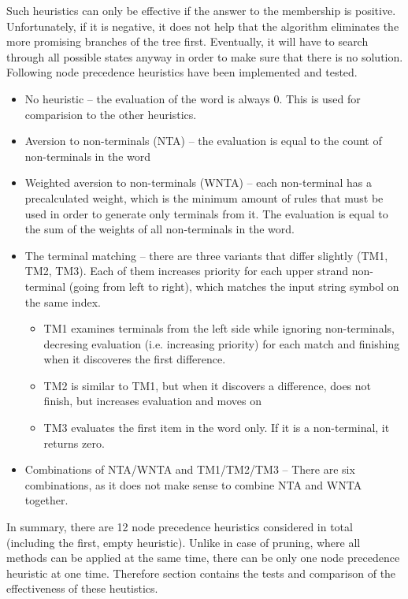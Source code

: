 \begin{enumerate}
Such heuristics can only be effective if the answer to the membership is positive. Unfortunately, if it is negative, it does not help that the algorithm eliminates the more promising branches of the tree first. Eventually, it will have to search through all possible states anyway in order to make sure that there is no solution.
Following node precedence heuristics have been implemented and tested.

\begin{itemize}
  \item{No heuristic -- the evaluation of the word is always 0. This is used for comparision to the other heuristics.}
  \item{Aversion to non-terminals (NTA) -- the evaluation is equal to the count of non-terminals in the word}
  \item{Weighted aversion to non-terminals (WNTA) -- each non-terminal has a precalculated weight, which is the minimum amount of rules that must be used in order to generate only terminals from it. The evaluation is equal to the sum of the weights of all non-terminals in the word.}
  \item{The terminal matching -- there are three variants that differ slightly (TM1, TM2, TM3). Each of them increases priority for each upper strand non-terminal (going from left to right), which matches the input string symbol on the same index.
  \begin{itemize}
    \item{TM1 examines terminals from the left side while ignoring non-terminals, decresing evaluation (i.e. increasing priority) for each match and finishing when it discoveres the first difference.}
    \item{TM2 is similar to TM1, but when it discovers a difference, does not finish, but increases evaluation and moves on}
    \item{TM3 evaluates the first item in the word only. If it is a non-terminal, it returns zero.}
  \end{itemize}
  }
  \item{Combinations of NTA/WNTA and TM1/TM2/TM3 -- There are six combinations, as it does not make sense to combine NTA and WNTA together.}
\end{itemize}

In summary, there are 12 node precedence heuristics considered in total (including the first, empty heuristic). Unlike in case of pruning, where all methods can be applied at the same time, there can be only one node precedence heuristic at one time. Therefore section  contains the tests and comparison of the effectiveness of these heutistics.
\end{enumerate}

